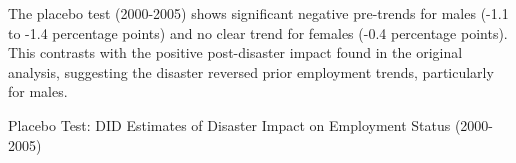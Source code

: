 \documentclass[serif, aspectratio=169]{beamer}
\newcommand{\returnbutton}[2]{%
  \vspace{-1.0cm}  %
  \hfill  %
  \hyperlink{#1}{%
    {\footnotesize\beamerbutton{#2}}%
  }%
  \vspace{0.3cm}  %
}
\begin{document}
\begin{frame}[label=employed_placebo]


The placebo test (2000-2005) shows significant negative pre-trends for males (-1.1 to -1.4 percentage points) and no clear trend for females (-0.4 percentage points). This contrasts with the positive post-disaster impact found in the original analysis, suggesting the disaster reversed prior employment trends, particularly for males.

\vspace{-1.5cm}
\returnbutton{employed}{Return}
\vspace{1.2cm}


\vspace{0.35cm}


\begin{table}[htbp]
\centering
\caption{Placebo Test: DID Estimates of Disaster Impact on Employment Status (2000-2005)}

\vspace{-0.2cm}


\end{table}
\end{frame}
\end{document}
